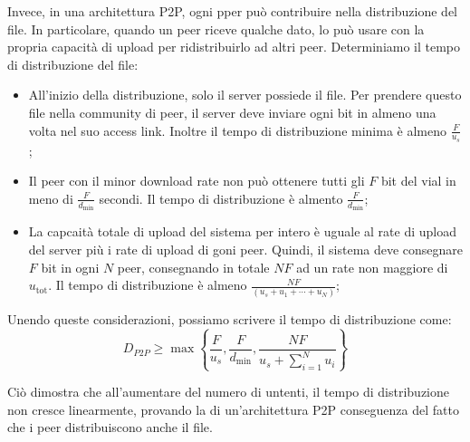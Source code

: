 \documentclass{book}
\newcommand{\tmop}[1]{\ensuremath{\operatorname{#1}}}
\newcommand{\tmtextbf}[1]{\text{{\bfseries{#1}}}}
\begin{document}
Invece, in una architettura P2P, ogni pper pu{\`o} contribuire nella
distribuzione del file. In particolare, quando un peer riceve qualche dato, lo
pu{\`o} usare con la propria capacit{\`a} di upload per ridistribuirlo ad
altri peer. Determiniamo il tempo di distribuzione del file:
\begin{itemize}
  \item All'inizio della distribuzione, solo il server possiede il file. Per
  prendere questo file nella community di peer, il server deve inviare ogni
  bit in almeno una volta nel suo access link. Inoltre il tempo di
  distribuzione minima {\`e} almeno $\frac{F}{u_s}$;
  
  \item Il peer con il minor download rate non pu{\`o} ottenere tutti gli $F$
  bit del vial in meno di $\frac{F}{d_{\min}}$ secondi. Il tempo di
  distribuzione {\`e} almento $\frac{F}{d_{\min}}$;
  
  \item La capcait{\`a} totale di upload del sistema per intero {\`e} uguale
  al rate di upload del server pi{\`u} i rate di upload di goni peer. Quindi,
  il sistema deve consegnare $F$ bit in ogni $N$ peer, consegnando in totale
  $NF$ ad un rate non maggiore di $u_{\tmop{tot}}$. Il tempo di distribuzione
  {\`e} almeno $\frac{NF}{(u_s + u_1 + \cdots + u_N)}$;
\end{itemize}
Unendo queste considerazioni, possiamo scrivere il tempo di distribuzione
come:
\[ D_{P 2 P} \geqslant \max \left\{ \frac{F}{u_s}, \frac{F}{d_{\min}},
   \frac{NF}{u_s + \sum^N_{i = 1} u_i} \right\} \]
{}

Ci{\`o} dimostra che all'aumentare del numero di untenti, il tempo di
distribuzione non cresce linearmente, provando la \tmtextbf{scalabilit{\`a}}
di un'architettura P2P conseguenza del fatto che i peer distribuiscono anche
il file.
\end{document}
